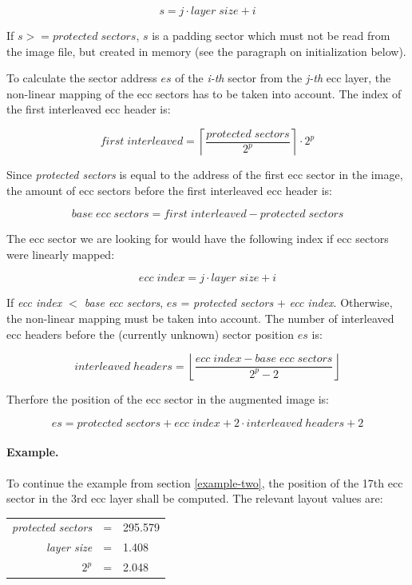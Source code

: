 \[s = j \cdot layer\; size + i\]

If $s >= protected\; sectors$, $s$ is a padding sector which must not be read 
from the image file, but created in memory (see the paragraph on initialization below).

\bigskip

To calculate the sector address $es$ of the {\em i-th} sector from the {\em j-th} 
ecc layer, the non-linear mapping of the ecc sectors has to be taken into account.
The index of the first interleaved ecc header is:

\[ first\; interleaved = \left\lceil\frac{protected\; sectors}{2^p}\right\rceil \cdot 2^p\]

Since {\em protected sectors} is equal to the address of the first ecc sector in the image,
the amount of ecc sectors before the first interleaved ecc header is:

\[ base\; ecc\; sectors = first\; interleaved - protected\; sectors\]

The ecc sector we are looking for would have the following index if ecc
sectors were linearly mapped:

\[ ecc\; index = j \cdot layer\; size + i\]

If {\em ecc index $<$ base ecc sectors}, $es$ = {\em protected sectors} + {\em ecc index}.
Otherwise, the non-linear mapping must be taken into account. The number of interleaved
ecc headers before the (currently unknown) sector position $es$ is:

\[ interleaved\; headers = \left\lfloor\frac{ecc\; index - base\; ecc\; sectors}{2^p - 2}\right\rfloor \]

Therfore the position of the ecc sector in the augmented image is:

\[ es = protected\; sectors + ecc\; index + 2 \cdot interleaved\; headers + 2 \] 

\paragraph{Example.} To continue the example from section \ref{example-two}, the
position of the 17th ecc sector in the 3rd ecc layer shall be computed. The relevant
layout values are:

\smallskip

\begin{center}
\begin{tabular}{rll}
{\em protected sectors} & = & 295.579 \\
{\em layer size} & = & 1.408 \\
{\em $2^p$} & = & 2.048 \\
\end{tabular}
\end{center}

